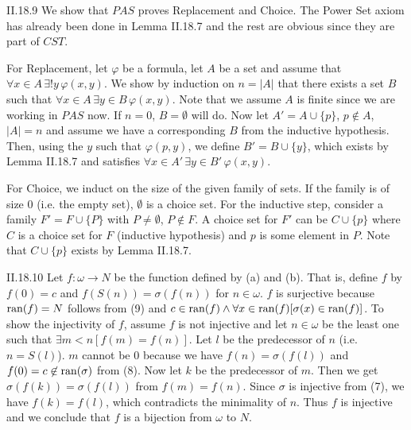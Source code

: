 \documentclass[12pt]{article}
\begin{document}
\begin{customthm}{II.18.9}
  We show that $PAS$ proves Replacement and Choice. The Power Set axiom has already been done in Lemma II.18.7 and the rest are obvious since they are part of $CST$.

  For Replacement, let $\varphi$ be a formula, let $A$ be a set and assume that $\forall x\in A\,\exists!y\,\varphi(x,y)$. We show by induction on $n=|A|$ that there exists a set $B$ such that $\forall x\in A\,\exists y\in B\,\varphi(x,y)$. Note that we assume $A$ is finite since we are working in $PAS$ now. If $n=0$, $B=\emptyset$ will do. Now let $A'=A\cup\{p\}$, $p\not\in A$, $|A|=n$ and assume we have a corresponding $B$ from the inductive hypothesis. Then, using the $y$ such that $\varphi(p,y)$, we define $B'=B\cup\{y\}$, which exists by Lemma II.18.7 and satisfies $\forall x\in A'\,\exists y\in B'\,\varphi(x,y)$.

  For Choice, we induct on the size of the given family of sets. If the family is of size $0$ (i.e. the empty set), $\emptyset$ is a choice set. For the inductive step, consider a family $F'=F\cup\{P\}$ with $P\neq\emptyset$, $P\not\in F$. A choice set for $F'$ can be $C\cup\{p\}$ where $C$ is a choice set for $F$ (inductive hypothesis) and $p$ is some element in $P$. Note that $C\cup\{p\}$ exists by Lemma II.18.7.
\end{customthm}

\begin{customthm}{II.18.10}
  Let $f:\omega\rightarrow N$ be the function defined by (a) and (b). That is, define $f$ by $f(0)=c$ and $f(S(n))=\sigma(f(n))$ for $n\in\omega$. $f$ is surjective because $\mathop{\mathrm{ran}}(f)=N$ follows from (9) and $c\in\mathop{\mathrm{ran}}(f)\wedge\forall x\in\mathop{\mathrm{ran}}(f)[\sigma(x)\in\mathop{\mathrm{ran}}(f)]$. To show the injectivity of $f$, assume $f$ is not injective and let $n\in\omega$ be the least one such that $\exists m<n[f(m)=f(n)]$. Let $l$ be the predecessor of $n$ (i.e. $n=S(l)$). $m$ cannot be $0$ because we have $f(n)=\sigma(f(l))$ and $f(0)=c\not\in\mathop{\mathrm{ran}}(\sigma)$ from (8). Now let $k$ be the predecessor of $m$. Then we get $\sigma(f(k))=\sigma(f(l))$ from $f(m)=f(n)$. Since $\sigma$ is injective from (7), we have $f(k)=f(l)$, which contradicts the minimality of $n$. Thus $f$ is injective and we conclude that $f$ is a bijection from $\omega$ to $N$.
\end{customthm}
\end{document}
